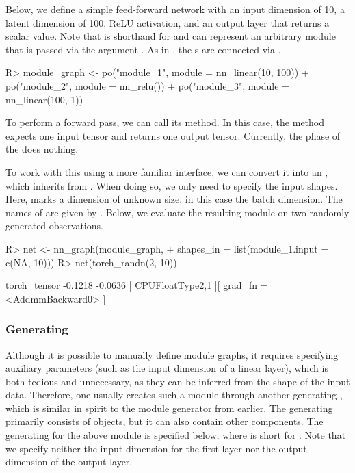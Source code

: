 \documentclass[article,shortnames]{jss}
\theoremstyle{definition}
\renewenvironment{CodeChunk}{\par\addvspace{0.6\baselineskip}\noindent\begin{minipage}{\linewidth}}{\end{minipage}\par\vspace{0.6\baselineskip}}
\begin{document}
Below, we define a simple feed-forward network with an input dimension of 10, a latent dimension of 100, ReLU activation, and an output layer that returns a scalar value.
Note that  is shorthand for  and can represent an arbitrary \torch{} module that is passed via the argument .
As in , the s are connected via \code{\%\text{>}\text{>}\%}.

\begin{CodeChunk}
\begin{CodeInput}
R> module_graph <- po("module_1", module = nn_linear(10, 100)) %
+    po("module_2", module = nn_relu()) %
+    po("module_3", module = nn_linear(100, 1))
\end{CodeInput}
\end{CodeChunk}

To perform a forward pass, we can call its  method.
In this case, the method expects one input tensor and returns one output tensor.
Currently, the  phase of the  does nothing.

To work with this  using a more familiar interface, we can convert it into an , which inherits from .
When doing so, we only need to specify the input shapes. Here,  marks a dimension of unknown size, in this case the batch dimension.
The names of  are given by .
Below, we evaluate the resulting module on two randomly generated observations.

\begin{CodeChunk}
\begin{CodeInput}
R> net <- nn_graph(module_graph,
+    shapes_in = list(module_1.input = c(NA, 10)))
R> net(torch_randn(2, 10))
\end{CodeInput}
\begin{CodeOutput}
torch_tensor
-0.1218
-0.0636
[ CPUFloatType{2,1} ][ grad_fn = <AddmmBackward0> ]
\end{CodeOutput}
\end{CodeChunk}

\subsubsection[Generating Graph]{Generating }

Although it is possible to manually define module graphs, it requires specifying auxiliary parameters (such as the input dimension of a linear layer), which is both tedious and unnecessary, as they can be inferred from the shape of the input data.
Therefore, one usually creates such a module  through another generating , which is similar in spirit to the module generator from earlier.
The generating  primarily consists of  objects, but it can also contain other components.
The generating  for the above module  is specified below, where  is short for .
Note that we specify neither the input dimension for the first layer nor the output dimension of the output layer.
\end{document}

